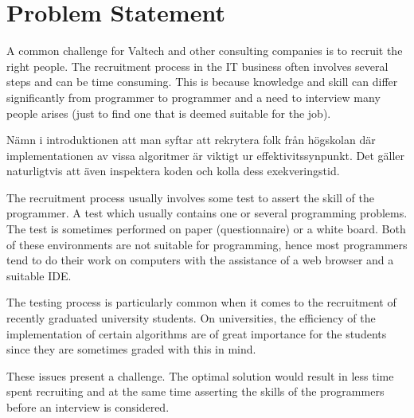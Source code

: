 \section{Problem Statement}
A common challenge for Valtech and other consulting companies is to recruit the right people. The recruitment process in the IT business often involves several steps and can be time consuming. This is because knowledge and skill can differ significantly from programmer to programmer and a need to interview many people arises (just to find one that is deemed suitable for the job).

Nämn i introduktionen att man syftar att rekrytera folk från högskolan där implementationen av vissa algoritmer är viktigt ur effektivitssynpunkt. Det gäller naturligtvis att även inspektera koden och kolla dess exekveringstid.

The recruitment process usually involves some test to assert the skill of the programmer. A test which usually contains one or several programming problems. The test is sometimes performed on paper (questionnaire) or a white board. Both of these environments are not suitable for programming, hence most programmers tend to do their work on computers with the assistance of a web browser and a suitable IDE.

The testing process is particularly common when it comes to the recruitment of recently graduated university students. On universities, the efficiency of the implementation of certain algorithms are of great importance for the students since they are sometimes graded with this in mind.

These issues present a challenge. The optimal solution would result in less time spent recruiting and at the same time asserting the skills of the programmers before an interview is considered.
